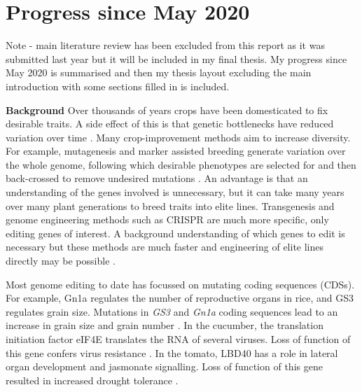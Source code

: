 \documentclass[../main.tex]{subfiles}
\begin{document}
\chapter{Progress since May 2020}\label{progress}
Note - main literature review has been excluded from this report as it was submitted last year but it will be included in my final thesis.
My progress since May 2020 is summarised and then my thesis layout excluding the main introduction with some sections filled in is included.

\textbf{Background}
Over thousands of years crops have been domesticated to fix desirable traits.
A side effect of this is that genetic bottlenecks have reduced variation over time \autocite{tanksleySeedBanksMolecular1997}.
Many crop\hyp{}improvement methods aim to increase diversity.
For example, mutagenesis and marker assisted breeding generate variation over the whole genome, following which desirable phenotypes are selected for and then back\hyp{}crossed to remove undesired mutations \autocite{tuberosaMarkerAssistedbreedingBreedSee2012}.
An advantage is that an understanding of the genes involved is unnecessary, but it can take many years over many plant generations to breed traits into elite lines.
Transgenesis and genome engineering methods such as CRISPR are much more specific, only editing genes of interest.
A background understanding of which genes to edit is necessary but these methods are much faster and engineering of elite lines directly may be possible \autocite{sedeekPlantGenomeEngineering2019}.

Most genome editing to date has focussed on mutating coding sequences (CDSs).
For example, Gn1a regulates the number of reproductive organs in rice, and GS3 regulates grain size.
Mutations in \textit{GS3} and \textit{Gn1a} coding sequences lead to an increase in grain size and grain number \autocite{shenQTLEditingConfers2018}.
In the cucumber, the translation initiation factor eIF4E translates the RNA of several viruses.
Loss of function of this gene confers virus resistance \autocite{chandrasekaranDevelopmentBroadVirus2016}.
In the tomato, LBD40 has a role in lateral organ development and jasmonate signalling.
Loss of function of this gene resulted in increased drought tolerance \autocite{liuCRISPRCas9Targeted2020}.
\end{document}
